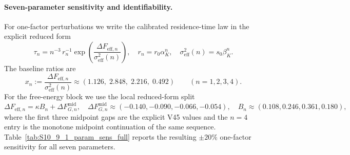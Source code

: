 \documentclass[11pt]{article}
\begin{document}
\paragraph{Seven-parameter sensitivity and identifiability.}
For one-factor perturbations we write the calibrated residence-time law in the
explicit reduced form
\begin{equation}
\tau_n = n^{-3}\,r_n^{-1}
\exp\!\left(\frac{\Delta F_{\mathrm{eff},n}}{\sigma_{\mathrm{eff}}^2(n)}\right),
\quad r_n=r_0\alpha_K^n, \quad
\sigma_{\mathrm{eff}}^2(n)=s_0\beta_K^n.
\label{eq:S10_9_1_tau_explicit}
\end{equation}
The baseline ratios are
\begin{equation}
x_n := \frac{\Delta F_{\mathrm{eff},n}}{\sigma_{\mathrm{eff}}^2(n)}
\approx (1.126,\;2.848,\;2.216,\;0.492) \qquad (n=1,2,3,4).
\label{eq:S10_9_1_xn}
\end{equation}
For the free-energy block we use the local reduced-form split
\begin{equation}
\Delta F_{\mathrm{eff},n} = \kappa B_n + \Delta F^{\mathrm{mid}}_{G,n},
\quad \Delta F^{\mathrm{mid}}_{G,n}\!\approx\!(-0.140,-0.090,-0.066,-0.054),
\quad B_n\!\approx\!(0.108,0.246,0.361,0.180),
\label{eq:S10_9_1_barrier_split}
\end{equation}
where the first three midpoint gaps are the explicit V45 values and the
$n=4$ entry is the monotone midpoint continuation of the same sequence.
Table~\ref{tab:S10_9_1_param_sens_full} reports the resulting $\pm20\%$
one-factor sensitivity for all seven parameters.
\end{document}
